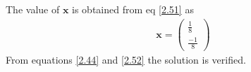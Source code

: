 \documentclass[journal,12pt,twocolumn]{IEEEtran}
\let\vec\mathbf
\numberwithin{equation}{subsection}
\newcommand{\myvec}[1]{\ensuremath{\begin{pmatrix}#1\end{pmatrix}}}
\begin{document}
The value of $\vec{x}$ is obtained from eq \ref{2.51} as
\begin{align}
\vec{x}=\myvec{\frac{1}{8}\\\frac{-1}{8}} \label{2.52}
\end{align}
From equations \ref{2.44} and \ref{2.52} the solution is verified.
\end{document}
